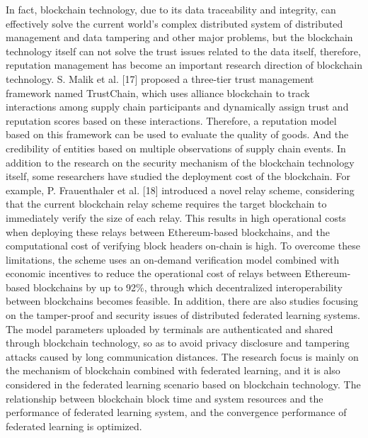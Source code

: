 \documentclass[lettersize,journal]{IEEEtran}
\begin{document}
In fact, blockchain technology, due to its data traceability and integrity, can effectively solve the current world's complex distributed system of distributed management and data tampering and other major problems, but the blockchain technology itself can not solve the trust issues related to the data itself, therefore, reputation management has become an important research direction of blockchain technology. S. Malik et al. [17] proposed a three-tier trust management framework named TrustChain, which uses alliance blockchain to track interactions among supply chain participants and dynamically assign trust and reputation scores based on these interactions. Therefore, a reputation model based on this framework can be used to evaluate the quality of goods. And the credibility of entities based on multiple observations of supply chain events. In addition to the research on the security mechanism of the blockchain technology itself, some researchers have studied the deployment cost of the blockchain. For example, P. Frauenthaler et al. [18] introduced a novel relay scheme, considering that the current blockchain relay scheme requires the target blockchain to immediately verify the size of each relay. This results in high operational costs when deploying these relays between Ethereum-based blockchains, and the computational cost of verifying block headers on-chain is high. To overcome these limitations, the scheme uses an on-demand verification model combined with economic incentives to reduce the operational cost of relays between Ethereum-based blockchains by up to 92\%, through which decentralized interoperability between blockchains becomes feasible. In addition, there are also studies focusing on the tamper-proof and security issues of distributed federated learning systems. The model parameters uploaded by terminals are authenticated and shared through blockchain technology, so as to avoid privacy disclosure and tampering attacks caused by long communication distances. The research focus is mainly on the mechanism of blockchain combined with federated learning, and it is also considered in the federated learning scenario based on blockchain technology. The relationship between blockchain block time and system resources and the performance of federated learning system, and the convergence performance of federated learning is optimized.
\end{document}
